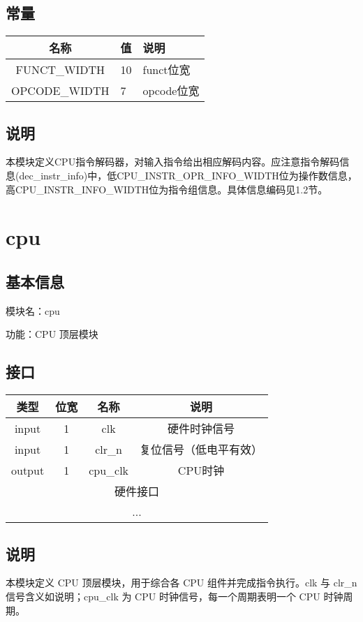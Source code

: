 \subsection{常量}
\begin{tabular}{|c|p{3cm}|p{6cm}|}
    \hline
    名称    &   值  &   说明\\\hline
    FUNCT\_WIDTH & 10 & funct位宽\\\hline
    OPCODE\_WIDTH & 7 & opcode位宽\\\hline
\end{tabular}
\subsection{说明}
本模块定义CPU指令解码器，对输入指令给出相应解码内容。应注意指令解码信息(dec\_instr\_info)中，低CPU\_INSTR\_OPR\_INFO\_WIDTH位为操作数信息，高CPU\_INSTR\_INFO\_WIDTH位为指令组信息。具体信息编码见1.2节。

\section{cpu}
\subsection{基本信息}
模块名：cpu

功能：CPU 顶层模块
\subsection{接口}
\begin{tabular}{|c|c|c|c|}
    \hline
    类型    & 位宽 &   名称    &   说明\\\hline
    input   &  1  &   clk     &   硬件时钟信号\\\hline
    input   &  1  &   clr\_n   &   复位信号（低电平有效）\\\hline
    output  &  1  &   cpu\_clk &   CPU时钟\\\hline
    \multicolumn{4}{|c|}{硬件接口}\\\hline
    \multicolumn{4}{|c|}{...}\\\hline
\end{tabular}

\subsection{说明}
本模块定义 CPU 顶层模块，用于综合各 CPU 组件并完成指令执行。clk 与 clr\_n 信号含义如说明；cpu\_clk 为 CPU 时钟信号，每一个周期表明一个 CPU 时钟周期。

